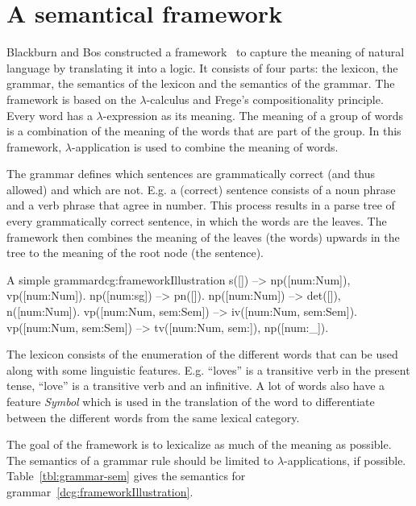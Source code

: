 \section{A semantical framework}
Blackburn and Bos constructed a framework~\cite{Blackburn2005, Blackburn2006} to capture the meaning of natural language by translating it into a logic. It consists of four parts: the lexicon, the grammar, the semantics of the lexicon and the semantics of the grammar. The framework is based on the $\lambda$-calculus and Frege's compositionality principle. Every word has a $\lambda$-expression as its meaning. The meaning of a group of words is a combination of the meaning of the words that are part of the group. In this framework, $\lambda$-application is used to combine the meaning of words.

The grammar defines which sentences are grammatically correct (and thus allowed) and which are not. E.g. a (correct) sentence consists of a noun phrase and a verb phrase that agree in number. This process results in a parse tree of every grammatically correct sentence, in which the words are the leaves. The framework then combines the meaning of the leaves (the words) upwards in the tree to the meaning of the root node (the sentence).

\begin{dcg}{A simple grammar}{dcg:frameworkIllustration}
s([]) -->
  np([num:Num]),
  vp([num:Num]).
np([num:sg]) -->
  pn([]).
np([num:Num]) -->
  det([]),
  n([num:Num]).
vp([num:Num, sem:Sem]) -->
  iv([num:Num, sem:Sem]).
vp([num:Num, sem:Sem]) -->
  tv([num:Num, sem:]),
  np([num:_]).
\end{dcg}

The lexicon consists of the enumeration of the different words that can be used along with some linguistic features. E.g. ``loves'' is a transitive verb in the present tense, ``love'' is a transitive verb and an infinitive. A lot of words also have a feature \textit{Symbol} which is used in the translation of the word to differentiate between the different words from the same lexical category.

The goal of the framework is to lexicalize as much of the meaning as possible. The semantics of a grammar rule should be limited to $\lambda$-applications, if possible. Table~\ref{tbl:grammar-sem} gives the semantics for grammar~\ref{dcg:frameworkIllustration}.

